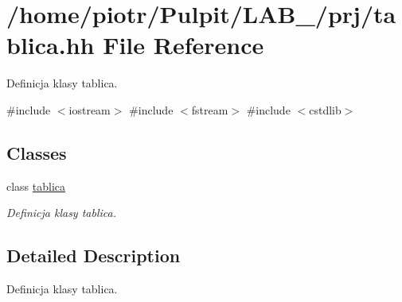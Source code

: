 \hypertarget{tablica_8hh}{\section{/home/piotr/\-Pulpit/\-L\-A\-B\-\_/prj/tablica.hh \-File \-Reference}
\label{tablica_8hh}
}


\-Definicja klasy tablica.  


{\ttfamily \#include $<$iostream$>$}\*
{\ttfamily \#include $<$fstream$>$}\*
{\ttfamily \#include $<$cstdlib$>$}\*
\subsection*{\-Classes}
\begin{DoxyCompactItemize}
\item 
class \hyperlink{classtablica}{tablica}
\begin{DoxyCompactList}\small\item\em \-Definicja klasy tablica. \end{DoxyCompactList}\end{DoxyCompactItemize}


\subsection{\-Detailed \-Description}
\-Definicja klasy tablica. 